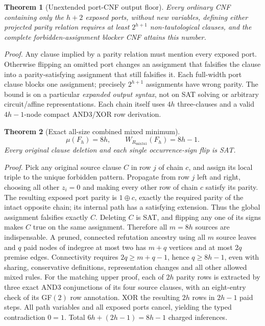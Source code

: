 \documentclass[11pt]{article}
\newtheorem{theorem}{Theorem}
\begin{document}
\begin{theorem}[Unextended port-CNF output floor]
Every ordinary CNF containing only the $h+2$ exposed ports, without new variables, defining either projected parity relation requires at least $2^{h+1}$ non-tautological clauses, and the complete forbidden-assignment blocker CNF attains this number.
\end{theorem}
\noindent\textit{Proof.} Any clause implied by a parity relation must mention every exposed port. Otherwise flipping an omitted port changes an assignment that falsifies the clause into a parity-satisfying assignment that still falsifies it. Each full-width port clause blocks one assignment; precisely $2^{h+1}$ assignments have wrong parity. The bound is on a particular \emph{expanded output syntax}, not on SAT solving or arbitrary circuit/affine representations. Each chain itself uses $4h$ three-clauses and a valid $4h-1$-node compact AND3/XOR row derivation.

\begin{theorem}[Exact all-size combined mixed minimum]
\[
\boxed{\mu(F_h)=8h,\qquad W_{R_{\mathrm{mix341}}}(F_h)=8h-1.}
\]
Every original clause deletion and each single occurrence-sign flip is SAT.
\end{theorem}
\noindent\textit{Proof.} Pick any original source clause $C$ in row $j$ of chain $c$, and assign its local triple to the unique forbidden pattern. Propagate from row $j$ left and right, choosing all other $z_i=0$ and making every other row of chain $c$ satisfy its parity. The resulting exposed port parity is $1\oplus c$, exactly the required parity of the intact opposite chain; its internal path has a satisfying extension. Thus the global assignment falsifies exactly $C$. Deleting $C$ is SAT, and flipping any one of its signs makes $C$ true on the same assignment. Therefore all $m=8h$ sources are indispensable. A pruned, connected refutation ancestry using all $m$ source leaves and $q$ paid nodes of indegree at most two has $m+q$ vertices and at most $2q$ premise edges. Connectivity requires $2q\ge m+q-1$, hence $q\ge8h-1$, even with sharing, conservative definitions, representation changes and all other allowed mixed rules. For the matching upper proof, each of $2h$ parity rows is extracted by three exact AND3 conjunctions of its four source clauses, with an eight-entry check of its GF$(2)$ row annotation. XOR the resulting $2h$ rows in $2h-1$ paid steps. All path variables and all exposed ports cancel, yielding the typed contradiction $0=1$. Total $6h+(2h-1)=8h-1$ charged inferences.
\end{document}
